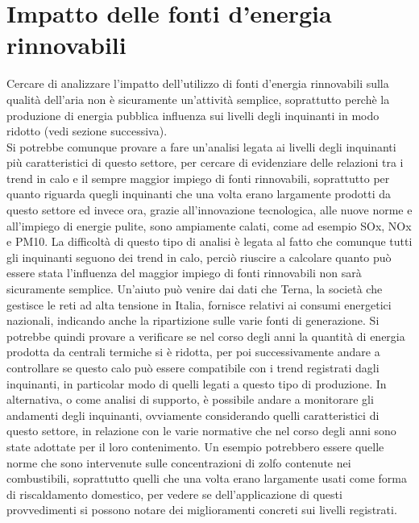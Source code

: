 \documentclass{article}
\begin{document}
\section{Impatto delle fonti d'energia rinnovabili}
Cercare di analizzare l'impatto dell'utilizzo di fonti d'energia rinnovabili sulla qualità dell'aria non è sicuramente un'attività semplice, soprattutto perchè la produzione di energia pubblica influenza sui livelli degli inquinanti in modo ridotto (vedi sezione successiva).
\\Si potrebbe comunque provare a fare un'analisi legata ai livelli degli inquinanti più caratteristici di questo settore, per cercare di evidenziare delle relazioni tra i trend in calo e il sempre maggior impiego di fonti rinnovabili, soprattutto per quanto riguarda quegli inquinanti che una volta erano largamente prodotti da questo settore ed invece ora, grazie all'innovazione tecnologica, alle nuove norme e all'impiego di energie pulite, sono ampiamente calati, come ad esempio SOx, NOx e PM10.
La difficoltà di questo tipo di analisi è legata al fatto che comunque tutti gli inquinanti seguono dei trend in calo, perciò riuscire a calcolare quanto può essere stata l'influenza del maggior impiego di fonti rinnovabili non sarà sicuramente semplice. Un'aiuto può venire dai dati che Terna, la società che gestisce le reti ad alta tensione in Italia, fornisce relativi ai consumi energetici nazionali, indicando anche la ripartizione sulle varie fonti di generazione. Si potrebbe quindi provare a verificare se nel corso degli anni la quantità di energia prodotta da centrali termiche si è ridotta, per poi successivamente andare a controllare se questo calo può essere compatibile con i trend registrati dagli inquinanti, in particolar modo di quelli legati a questo tipo di produzione. In alternativa, o come analisi di supporto, è possibile andare a monitorare gli andamenti degli inquinanti, ovviamente considerando quelli caratteristici di questo settore, in relazione con le varie normative che nel corso degli anni sono state adottate per il loro contenimento. Un esempio potrebbero essere quelle norme che sono intervenute sulle concentrazioni di zolfo contenute nei combustibili, soprattutto quelli che una volta erano largamente usati come forma di riscaldamento domestico, per vedere se dell'applicazione di questi provvedimenti si possono notare dei miglioramenti concreti sui livelli registrati.
\end{document}
